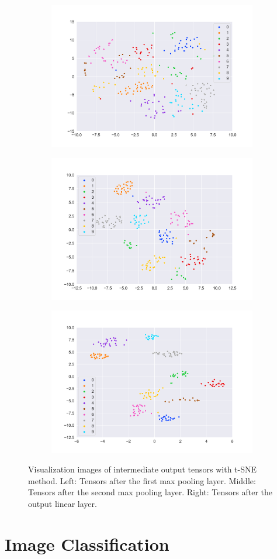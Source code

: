 \begin{figure}[htbp]
    \centering
    \begin{subfigure}
        \centering
        \includegraphics[width=0.32\linewidth]{../images/mnist_feature_map1_tsne.png}
        \label{fig:mnist_tSNE_1}
    \end{subfigure}
    \begin{subfigure}
        \centering
        \includegraphics[width=0.32\linewidth]{../images/mnist_feature_map2_tsne.png}
        \label{fig:mnist_tSNE_2}
    \end{subfigure}
    \begin{subfigure}
        \centering
        \includegraphics[width=0.32\linewidth]{../images/mnist_feature_map3_tsne.png}
        \label{fig:mnist_tSNE_3}
    \end{subfigure}
    \caption{Visualization images of intermediate output tensors with t-SNE method. Left: Tensors after the first max pooling layer. Middle: Tensors after the second max pooling layer. Right: Tensors after the output linear layer.}
    \label{fig:mnist_tsne}
\end{figure}
\section{Image Classification}

